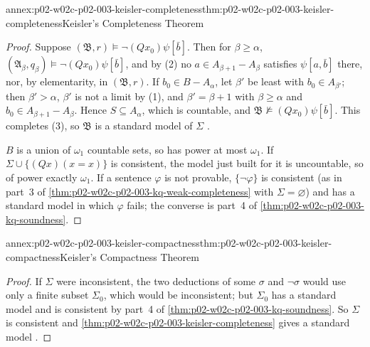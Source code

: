\begin{annexitem}{annex:p02-w02c-p02-003-keisler-completeness}{thm:p02-w02c-p02-003-keisler-completeness}{Keisler's Completeness Theorem}
\begin{proof}
Suppose \((\mathfrak B,r)\models\neg(Qx_0)\psi[\bar b]\).  Then for
\(\beta\ge\alpha\), \((\mathfrak A_\beta,q_\beta)\models\neg(Qx_0)\psi[\bar
b]\), and by (2) no \(a\in A_{\beta+1}-A_\beta\) satisfies \(\psi[a,\bar b]\)
there, nor, by elementarity, in \((\mathfrak B,r)\).  If \(b_0\in B-A_\alpha\),
let \(\beta'\) be least with \(b_0\in A_{\beta'}\); then \(\beta'>\alpha\),
\(\beta'\) is not a limit by (1), and \(\beta'=\beta+1\) with
\(\beta\ge\alpha\) and \(b_0\in A_{\beta+1}-A_\beta\).  Hence
\(S\subseteq A_\alpha\), which is countable, and
\(\mathfrak B\not\models(Qx_0)\psi[\bar b]\).  This completes (3), so
\(\mathfrak B\) is a standard model of \(\Sigma\)
\cite[\S2, pp.~24--26]{Keisler1970}.

\(B\) is a union of \(\omega_1\) countable sets, so has power at most
\(\omega_1\).  If \(\Sigma\cup\{(Qx)(x=x)\}\) is consistent, the model just
built for it is uncountable, so of power exactly \(\omega_1\).  If a
sentence \(\varphi\) is not provable, \(\{\neg\varphi\}\) is consistent (as
in part~3 of \cref{thm:p02-w02c-p02-003-kq-weak-completeness} with
\(\Sigma=\varnothing\)) and has a standard model in which \(\varphi\) fails;
the converse is part~4 of \cref{thm:p02-w02c-p02-003-kq-soundness}.
\end{proof}
\end{annexitem}

\begin{annexitem}{annex:p02-w02c-p02-003-keisler-compactness}{thm:p02-w02c-p02-003-keisler-compactness}{Keisler's Compactness Theorem}
\begin{proof}
If \(\Sigma\) were inconsistent, the two deductions of some \(\sigma\) and
\(\neg\sigma\) would use only a finite subset \(\Sigma_0\), which would be
inconsistent; but \(\Sigma_0\) has a standard model and is consistent by
part~4 of \cref{thm:p02-w02c-p02-003-kq-soundness}.  So \(\Sigma\) is
consistent and \cref{thm:p02-w02c-p02-003-keisler-completeness} gives a
standard model \cite[\S2, Corollary~2.11, p.~27]{Keisler1970}.
\end{proof}
\end{annexitem}

